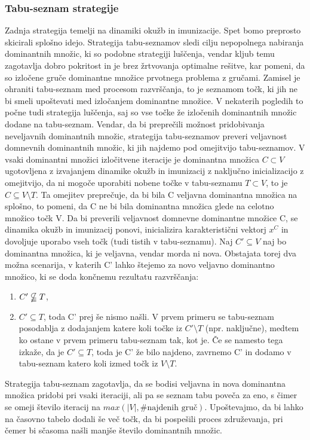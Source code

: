 \documentclass[a4paper]{article}
\begin{document}
\subsubsection{Tabu-seznam strategije} Zadnja strategija temelji na dinamiki okužb in imunizacije. Spet bomo preprosto skicirali splošno idejo. Strategija tabu-seznamov sledi cilju nepopolnega nabiranja dominantnih množic, ki so podobne strategiji luščenja, vendar kljub temu zagotavlja dobro pokritost in je brez žrtvovanja optimalne rešitve, kar pomeni, da so izločene gruče dominantne množice prvotnega problema z gručami. Zamisel je ohraniti tabu-seznam med procesom razvrščanja, to je seznamom točk, ki jih ne bi smeli upoštevati med izločanjem dominantne množice. V nekaterih pogledih to počne tudi strategija luščenja, saj so vse točke že izločenih dominantnih množic dodane na tabu-seznam. Vendar, da bi preprečili možnost pridobivanja neveljavnih dominantnih množic, strategija tabu-seznamov preveri veljavnost domnevnih dominantnih množic, ki jih najdemo pod omejitvijo tabu-seznamov. V vsaki dominantni množici izločitvene iteracije je dominantna množica $C \subset V$ ugotovljena z izvajanjem dinamike okužb in imunizacij z naključno inicializacijo z omejitvijo, da ni mogoče uporabiti nobene točke v tabu-seznamu $T \subset V$, to je $C \subseteq V\setminus T$. Ta omejitev preprečuje, da bi bila C veljavna dominantna množica na splošno, to pomeni, da C ne bi bila dominantna množica glede na celotno množico točk V. Da bi preverili veljavnost domnevne dominantne množice C, se dinamika okužb in imunizacij ponovi, inicializira karakteristični vektorj $x^C$ in dovoljuje uporabo vseh točk (tudi tistih v tabu-seznamu). Naj $C' \subseteq V$ naj bo dominantna množica, ki je veljavna, vendar morda ni nova. Obstajata torej dva možna scenarija, v katerih C' lahko štejemo za novo veljavno dominantno množico, ki se doda končnemu rezultatu razvrščanja:
\begin{enumerate}
\item $C' \nsubseteqq T$,
\item $C' \subseteq T$, toda C' prej še nismo našli. V prvem primeru se tabu-seznam posodablja z dodajanjem katere koli točke iz $C'\setminus T$ (npr. naključne), medtem ko ostane v prvem primeru tabu-seznam tak, kot je. Če se namesto tega izkaže, da je $C'\subseteq T$, toda je C' že bilo najdeno, zavrnemo C' in dodamo v tabu-seznam katero koli izmed točk iz $V\setminus T$.
\end{enumerate}
Strategija tabu-seznam zagotavlja, da se bodisi veljavna in nova dominantna množica pridobi pri vsaki iteraciji, ali pa se seznam tabu poveča za eno, s čimer se omeji število iteracij na $max(\lvert V \rvert, \text{\#najdenih gruč})$. Upoštevajmo, da bi lahko na časovno tabelo dodali še več točk, da bi pospešili proces združevanja, pri čemer bi sčasoma našli manjše število dominantnih množic.
\end{document}
